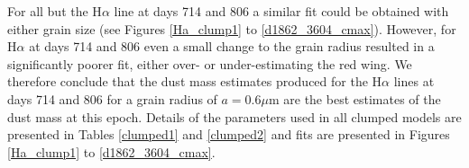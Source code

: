 \documentclass[useAMS,usenatbib,usegraphicx]{mnras}
\begin{document}
For all but the H$\alpha$ line at days 714 and 806 a similar fit could be obtained with either grain size (see Figures \ref{Ha_clump1} to 
\ref{d1862_3604_cmax}).  However, for H$\alpha$ at days 714 and 806  even a small change to the grain radius resulted in a significantly poorer fit, either 
over- or under-estimating the red wing. We therefore conclude that the dust mass estimates produced for the H$\alpha$ lines at days 714 and 
806 for a grain radius of $a=0.6\mu$m are the best estimates of the dust mass 
at this epoch.  Details of the parameters used in all clumped models are
presented in Tables \ref{clumped1} and \ref{clumped2} and fits are presented in Figures \ref{Ha_clump1} to \ref{d1862_3604_cmax}.


\end{document}
